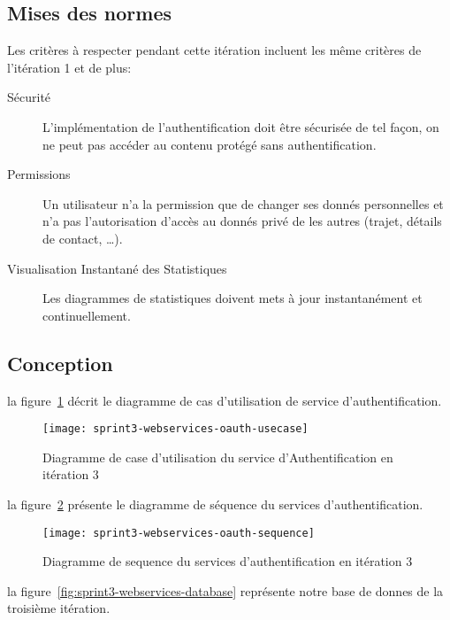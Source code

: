 \subsection{Mises des normes}

Les critères à respecter pendant cette itération incluent les même critères de
l'itération 1 et de plus:

\begin{description}
    \item [Sécurité] L'implémentation de l'authentification doit être sécurisée
        de tel façon, on ne peut pas accéder au contenu protégé sans
        authentification.
    \item [Permissions] Un utilisateur n'a la permission que de changer ses
        donnés personnelles et n'a pas l'autorisation d'accès au donnés privé
        de les autres (trajet, détails de contact, \ldots).
    \item [Visualisation Instantané des Statistiques] Les diagrammes de
        statistiques doivent mets à jour instantanément et continuellement.
\end{description}

\subsection{Conception}

la figure~\ref{fig:sprint3-webservices-oauth-usecase} décrit le diagramme
de cas d'utilisation de service d'authentification.

\begin{figure}[htbp]
    \centering
    \texttt{[image: sprint3-webservices-oauth-usecase]}
    \caption{Diagramme de case d'utilisation du service d'Authentification en itération 3}
      \label{fig:sprint3-webservices-oauth-usecase}
\end{figure}

la figure~\ref{fig:sprint3-webservices-oauth-sequence} présente le diagramme de
séquence du services d'authentification.

\begin{figure}[htbp]
    \centering
    \texttt{[image: sprint3-webservices-oauth-sequence]}
    \caption{Diagramme de sequence du services d'authentification en itération 3}
    \label{fig:sprint3-webservices-oauth-sequence}
\end{figure}

la figure~\ref{fig:sprint3-webservices-database} représente notre base de
donnes de la troisième itération.

